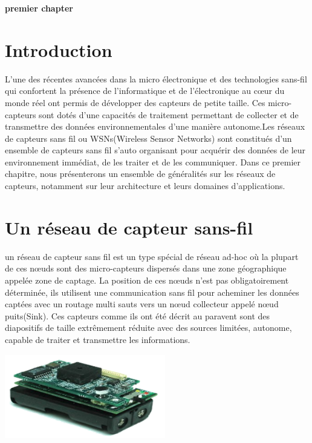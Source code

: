 \setcounter{chapter}{1}

\begin{center}
	\Huge\textbf{premier chapter}	
\end{center}

\section{Introduction}
L’une des récentes avancées dans la micro électronique et des technologies sans-fil qui confortent la présence de l’informatique et de l’électronique au cœur du monde réel ont permis de développer des capteurs de petite taille. Ces  micro-capteurs sont dotés d’une capacités de traitement permettant de collecter et de transmettre des données environnementales d'une manière autonome.Les réseaux de capteurs sans fil ou WSNs(Wireless Sensor Networks) sont constitués d’un ensemble de capteurs sans fil s’auto organisant pour acquérir des données de leur environnement immédiat, de les traiter et de les communiquer.
Dans ce premier chapitre, nous présenterons un ensemble de généralités sur les réseaux de capteurs, notamment sur leur architecture et leurs domaines d’applications.\\

\section{Un réseau de capteur sans-fil}
un réseau de capteur sans fil est un type spécial de réseau ad-hoc où la plupart de ces nœuds sont des micro-capteurs dispersés dans une zone géographique appelée zone de captage. La position de ces nœuds n’est pas obligatoirement déterminée, ils utilisent une communication sans fil pour acheminer les données captées avec un routage multi sauts vers un nœud collecteur appelé nœud puits(Sink). Ces capteurs comme ils ont été décrit au paravent  sont des diapositifs de taille extrêmement réduite avec des sources limitées, autonome, capable de traiter et transmettre les informations.

\begin{center}
\includegraphics[width=7cm,height=3.7cm]{Chap1/chap1.png}
\end{center}


